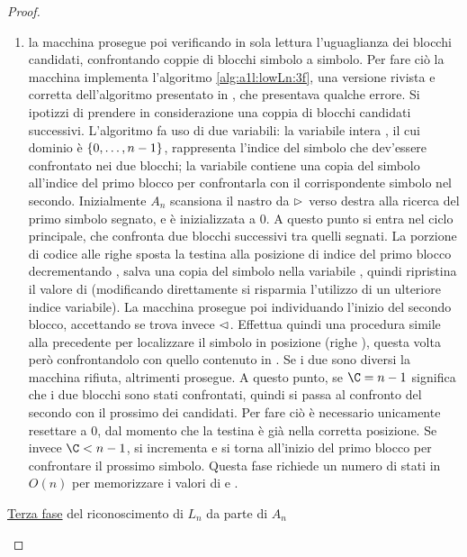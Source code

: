 \begin{proof}
\begin{enumerate}
		\item \label{itm:a1l:lowLn:LA3} la macchina prosegue poi verificando in sola lettura l'uguaglianza dei blocchi candidati, confrontando coppie di blocchi simbolo a simbolo. Per fare ciò la macchina implementa l'algoritmo \ref{alg:a1l:lowLn:3f}, una versione rivista e corretta dell'algoritmo presentato in \cite{Pighizzini:14:limitedRE}, che presentava qualche errore. Si ipotizzi di prendere in considerazione una coppia di blocchi candidati successivi. L'algoritmo fa uso di due variabili: la variabile intera \C, il cui dominio è $\left\{ 0,\dots,n-1 \right\}$, rappresenta l'indice del simbolo che dev'essere confrontato nei due blocchi; la variabile \B contiene una copia del simbolo all'indice \C del primo blocco per confrontarla con il corrispondente simbolo nel secondo. Inizialmente $A_n$ scansiona il nastro da $\rhd$ verso destra alla ricerca del primo simbolo segnato, e \C è inizializzata a $0$. A questo punto si entra nel ciclo principale, che confronta due blocchi successivi tra quelli segnati. La porzione di codice alle righe  sposta la testina alla posizione di indice \C del primo blocco decrementando \C, salva una copia del simbolo nella variabile \B, quindi ripristina il valore di \C (modificando direttamente \C si risparmia l'utilizzo di un ulteriore indice variabile). La macchina prosegue poi individuando l'inizio del secondo blocco, accettando se trova invece $\lhd$. Effettua quindi una procedura simile alla precedente per localizzare il simbolo in posizione \C (righe ), questa volta però confrontandolo con quello contenuto in \B. Se i due sono diversi la macchina rifiuta, altrimenti prosegue. A questo punto, se $\C=n-1$ significa che i due blocchi sono stati confrontati, quindi si passa al confronto del secondo con il prossimo dei candidati. Per fare ciò è necessario unicamente resettare \C a $0$, dal momento che la testina è già nella corretta posizione. Se invece $\C<n-1$, si incrementa \C e si torna all'inizio del primo blocco per confrontare il prossimo simbolo. Questa fase richiede un numero di stati in $O(n)$ per memorizzare i valori di \B e \C.
	\end{enumerate}

	\IncMargin{1em}
	\begin{algorithm}
		
		\caption{\hyperref[itm:a1l:lowLn:LA3]{Terza fase} del riconoscimento di $L_n$ da parte di $A_n$}
		\label{alg:a1l:lowLn:3f}
	\end{algorithm}
	\DecMargin{1em}
\end{proof}

